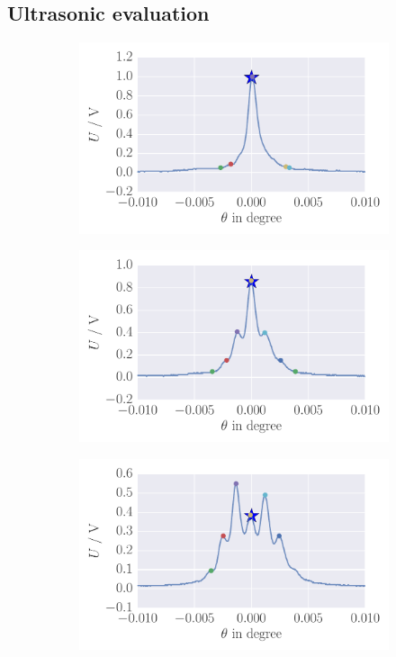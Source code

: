 \subsection{Ultrasonic evaluation}
\begin{figure}
    \begin{subfigure}[b]{\picwidth}
        \includegraphics[width=1.2\textwidth]{analysis/figures/raman_001}
        \caption{}
        \label{fig:raman_001}
    \end{subfigure}\qquad
    \begin{subfigure}[b]{\picwidth}
        \includegraphics[width=1.2\textwidth]{analysis/figures/raman_007}
        \caption{}
        \label{fig:raman_007}
    \end{subfigure}
    \begin{subfigure}[b]{\picwidth}
        \includegraphics[width=1.2\textwidth]{analysis/figures/raman_014}

\end{subfigure}
\end{figure}
